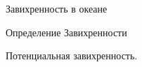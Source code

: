 \begin{chapter}{Завихренность в океане}
\begin{section}{Определение Завихренности}
\begin{paragraph}{Потенциальная завихренность.}
%


\end{paragraph}
\end{section}
\end{chapter}
